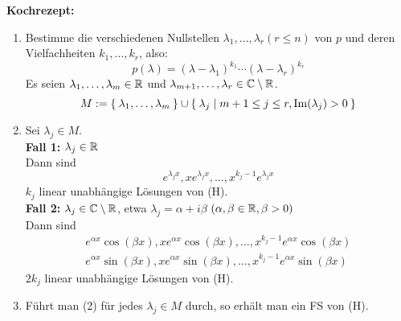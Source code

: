 \documentclass[a4paper,oneside,DIV15,BCOR12mm,chapterprefix=true,headings=onelinechapter]{scrbook}
\begin{document}
\textbf{Kochrezept:}
\begin{enumerate}
\item Bestimme die verschiedenen Nullstellen $\lambda_1,\ldots,\lambda_r (r\le n)$ von $p$
und deren Vielfachheiten $k_1,\ldots,k_r$, also:
\[p(\lambda)=(\lambda-\lambda_1)^{k_1}\cdots(\lambda-\lambda_r)^{k_r}\]
Es seien $\lambda_1,\ldots,\lambda_m\in\mathbb{R}$ und $\lambda_{m+1},\ldots,\lambda_r\in\mathbb{C}\setminus\mathbb{R}$.
\[M:=\Set{\lambda_1,\ldots,\lambda_m}\cup\Set{\lambda_j | m+1\le j\le r,\mathop{\rm Im}\nolimits(\lambda_j)>0}\]
\item Sei $\lambda_j\in M$.\\
\textbf{Fall 1:} $\lambda_j\in\mathbb{R}$\\
Dann sind
\[e^{\lambda_jx},xe^{\lambda_jx},\ldots,x^{k_j-1}e^{\lambda_jx}\]
$k_j$ linear unabhängige Lösungen von (H).\\
\textbf{Fall 2:} $\lambda_j\in\mathbb{C}\setminus\mathbb{R}$, etwa $\lambda_j=\alpha+i\beta$ $(\alpha,\beta\in\mathbb{R},\beta>0)$\\
Dann sind
\begin{align*}
e^{\alpha x}\cos(\beta x), xe^{\alpha x}\cos(\beta x),\ldots,x^{k_j-1}e^{\alpha x}\cos(\beta x)\\
e^{\alpha x}\sin(\beta x), xe^{\alpha x}\sin(\beta x),\ldots,x^{k_j-1}e^{\alpha x}\sin(\beta x)
\end{align*}
$2k_j$ linear unabhängige Lösungen von (H).
\item Führt man (2) für jedes $\lambda_j\in M$ durch, so erhält man ein FS von (H).
\end{enumerate}
\end{document}
